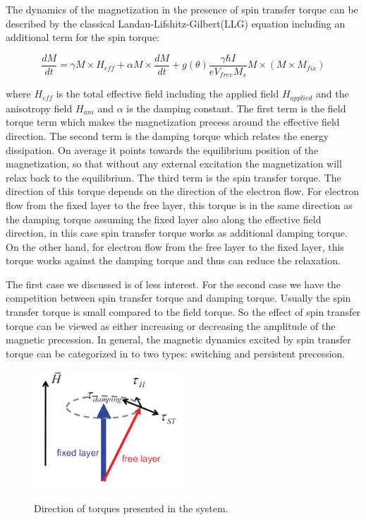 The dynamics of the magnetization in the presence of spin transfer torque can be described by the classical Landau-Lifshitz-Gilbert(LLG) equation including an additional term for the spin torque:

\begin{equation}
\frac{dM}{dt} = \gamma M \times H_{eff} + \alpha M \times \frac{dM}{dt} + g(\theta)\frac{\gamma \hbar I}{eV_{free}M_s}M \times(M \times M_{fix})
\end{equation}

where $H_{eff}$ is the total effective field including the applied field $H_{applied}$ and the anisotropy field $H_{ani}$ and $\alpha$ is the damping constant. The first term is the field torque term which makes the magnetization precess around the effective field direction. The second term is the damping torque which relates the energy dissipation. On average it points towards the equilibrium position of the magnetization, so that without any external excitation the magnetization will relax back to the equilibrium. The third term is the spin transfer torque. The direction of this torque depends on the direction of the electron flow. For electron flow from the fixed layer to the free layer, this torque is in the same direction as the damping torque assuming the fixed layer also along the effective field direction, in this case spin transfer torque works as additional damping torque. On the other hand, for electron flow from the free layer to the fixed layer, this torque works against the damping torque and thus can reduce the relaxation.

The first case we discussed is of less interest. For the second case we have the competition between spin transfer torque and damping torque\cite{Bias}. Usually the spin transfer torque is small compared to the field torque. So the effect of spin transfer torque can be viewed as either increasing or decreasing the amplitude of the magnetic precession. In general, the magnetic dynamics excited by spin transfer torque can be categorized in to two types: switching and persistent precession.

\begin{figure}[h!]
\centering
\includegraphics[width=0.5\textwidth]{fig/dampingtorque.PNG}
\label{Torque}
\caption{Direction of torques presented in the system.}

\end{figure}

